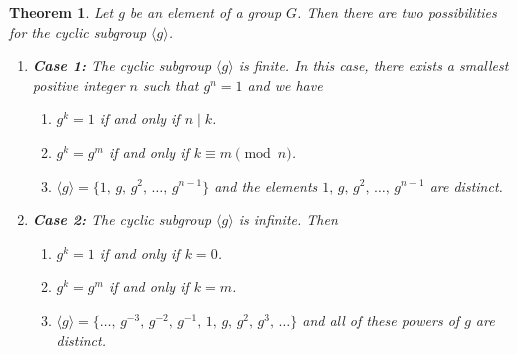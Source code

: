 \documentclass[11pt]{article}
\newcommand{\divides}{\ensuremath{\mid}}
\theoremstyle{plain}
\newtheorem{thm}{Theorem}%
\theoremstyle{definition}
\begin{document}
\begin{thm} 
\label{thm:4}
   Let $g$ be an element of a group $G$.  Then there are
two possibilities for the cyclic subgroup $\langle g\rangle$.
\begin{enumerate}
\item[{ }]{\bf Case 1:}  The cyclic subgroup $\langle g\rangle$ is finite.  In this
case, there exists a smallest positive integer $n$ such that
$g^n=1$ and we have
\begin{enumerate}
\item $g^k=1$ if and only if $n\divides k$.
\item  $g^k=g^m$ if and only if $k\equiv m \pmod{n}$.
\item  $\langle g\rangle =\{1,\, g,\, g^2,\, \ldots,\, g^{n-1}\}$ and
the elements $1,\, g,\, g^2,\, \ldots,\, g^{n-1}$ are distinct.
\end{enumerate}

\item[{ }]{\bf Case 2:}  The cyclic subgroup $\langle g\rangle $ is infinite.
Then
\begin{enumerate}\addtocounter{enumii}{3}
\item $g^k=1$ if and only if $k=0$.
\item  $g^k=g^m$ if and only if $k=m$.
\item  $\langle g\rangle =\{ \ldots,\, g^{-3},\,
g^{-2},\, g^{-1},\, 1,\, g,\,g^2,\, g^3,\, \ldots\}$ and all of
these powers of $g$ are distinct.
\end{enumerate}
\end{enumerate}
\end{thm}
\end{document}

